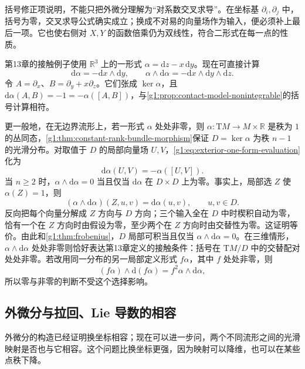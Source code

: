 括号修正项说明，不能只把外微分理解为“对系数交叉求导”。在坐标基 \(\partial_i,\partial_j\) 中，括号为零，交叉求导公式确实成立；换成不对易的向量场作为输入，便必须补上最后一项。它也使右侧对 \(X,Y\) 的函数倍乘仍为双线性，符合二形式在每一点的性质。

\begin{example}\label{g1:exm:contact-form-exterior-test}
	第13章的接触例子使用 \(\mathbb R^3\) 上的一形式 \(\alpha=\mathrm{d}z-x\,\mathrm{d}y\)。现在可直接计算
	\[
		\mathrm{d}\alpha=-\mathrm{d}x\wedge\mathrm{d}y,\qquad
		\alpha\wedge\mathrm{d}\alpha=-\mathrm{d}x\wedge\mathrm{d}y\wedge\mathrm{d}z.
	\]
	令 \(A=\partial_x\)、\(B=\partial_y+x\partial_z\)。它们张成 \(\ker\alpha\)，且 \(\mathrm{d}\alpha(A,B)=-1=-\alpha([A,B])\)，与\cref{g1:prop:contact-model-nonintegrable}的括号计算相符。

	更一般地，在无边界流形上，若一形式 \(\alpha\) 处处非零，则 \(\alpha:\mathrm{T}M\to M\times\mathbb R\) 是秩为 \(1\) 的丛同态，\cref{g1:thm:constant-rank-bundle-morphism}保证 \(D=\ker\alpha\) 为秩 \(n-1\) 的光滑分布。对取值于 \(D\) 的局部向量场 \(U,V\)，\eqref{g1:eq:exterior-one-form-evaluation}化为
	\[
		\mathrm{d}\alpha(U,V)=-\alpha([U,V]).
	\]
	当 \(n\geq2\) 时，\(\alpha\wedge\mathrm{d}\alpha=0\) 当且仅当 \(\mathrm{d}\alpha\) 在 \(D\times D\) 上为零。事实上，局部选 \(Z\) 使 \(\alpha(Z)=1\)，则
	\[
		(\alpha\wedge\mathrm{d}\alpha)(Z,u,v)=\mathrm{d}\alpha(u,v),\qquad u,v\in D.
	\]
	反向把每个向量分解成 \(Z\) 方向与 \(D\) 方向；三个输入全在 \(D\) 中时楔积自动为零，恰有一个在 \(Z\) 方向时由假设为零，至少两个在 \(Z\) 方向时由交替性为零。这证明等价。由此和\cref{g1:thm:frobenius}，\(D\) 局部可积当且仅当 \(\alpha\wedge\mathrm{d}\alpha=0\)。在三维情形，\(\alpha\wedge\mathrm{d}\alpha\) 处处非零则恰好表达第13章定义的接触条件：括号在 \(\mathrm{T}M/D\) 中的交替配对处处非零。若改用同一分布的另一局部定义形式 \(f\alpha\)，其中 \(f\) 处处非零，则
	\[
		(f\alpha)\wedge\mathrm{d}(f\alpha)=f^2\alpha\wedge\mathrm{d}\alpha,
	\]
	所以零与非零的判断不受这个选择影响。
\end{example}

\subsection{外微分与拉回、Lie 导数的相容}
\label{g1:subsec:1401:04}

外微分的构造已经证明换坐标相容；现在可以进一步问，两个不同流形之间的光滑映射是否也与它相容。这个问题比换坐标更强，因为映射可以降维，也可以在某些点秩下降。

